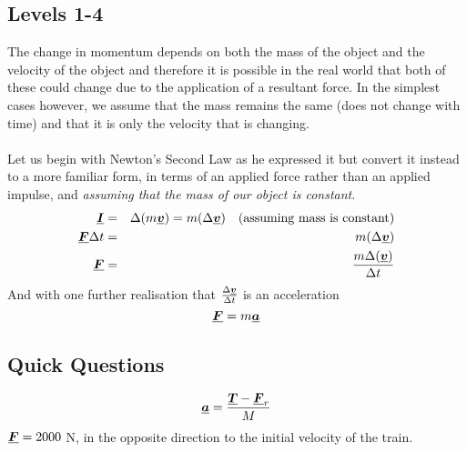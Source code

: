 \subsection*{Levels 1-4}
The change in momentum depends on both the mass of the object and the velocity of the object and therefore it is possible in the real world that both of these could change due to the application of a resultant force. In the simplest cases however, we assume that the mass remains the same (does not change with time) and that it is only the velocity that is changing.
\\
\\
Let us begin with Newton's Second Law as he expressed it but convert it instead to a more familiar form, in terms of an applied force rather than an applied impulse, and {\it assuming that the mass of our object is constant}.
\begin{eqnarray}
{\vtr I}&=&\Delta({m {\vtr v}}) =m(\Delta{\vtr v})\ \ \ (\mbox{assuming mass is constant})\nonumber\\
{\vtr F}\Delta t&=&m(\Delta{\vtr v}) \nonumber \\
{\vtr F}&=&\frac{m\Delta({\vtr v})}{\Delta t} \label{eqn:NIIF}
\end{eqnarray}
And with one further realisation that $\frac{\Delta {\mathit{\underline{\boldsymbol{v}}}}}{\Delta t}$  is an acceleration
\begin{equation}
{\mathit{\underline{\boldsymbol{F}}}}=m {\mathit{\underline{\boldsymbol{a}}}}
\end{equation}

\subsection*{Quick Questions}
 {}
  {
\begin{equation}
{\mathit{\underline{\boldsymbol{a}}}}=\frac{{\mathit{\underline{\boldsymbol{T}}}}-{\mathit{\underline{\boldsymbol{F}}}_r}}{M}\nonumber
\end{equation}}
 {${\mathit{\underline{\boldsymbol{F}}}}=2000$ N, in the opposite direction to the initial velocity of the train.}


